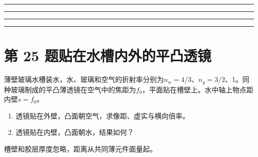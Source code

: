\documentclass[UTF8,fontset=fandol,a4paper,11pt]{ctexart}
\newcommand{\workarea}{\par\vspace{7mm}\noindent{\small\color{muted}作答区}\par\vspace{4mm}
\noindent\textcolor{rulegray}{\rule{\linewidth}{0.3pt}}\par\vspace{16mm}
\noindent\textcolor{rulegray}{\rule{\linewidth}{0.3pt}}\par\vspace{16mm}
\noindent\textcolor{rulegray}{\rule{\linewidth}{0.3pt}}\par\vspace{16mm}
\noindent\textcolor{rulegray}{\rule{\linewidth}{0.3pt}}}
\begin{document}
\workarea

\clearpage


\section*{第 25 题\quad 贴在水槽内外的平凸透镜}\label{q:25}

薄壁玻璃水槽装水，水、玻璃和空气的折射率分别为$n_w=4/3$、$n_g=3/2$、1。同种玻璃制成的平凸薄透镜在空气中的焦距为$f_0$，平面贴在槽壁上。水中轴上物点距内壁$s=f_0$。
\begin{enumerate}
\item 透镜贴在外壁，凸面朝空气，求像距、虚实与横向倍率。
\item 透镜贴在内壁，凸面朝水，结果如何？
\end{enumerate}
槽壁和胶层厚度忽略，距离从共同薄元件面量起。
\end{document}
